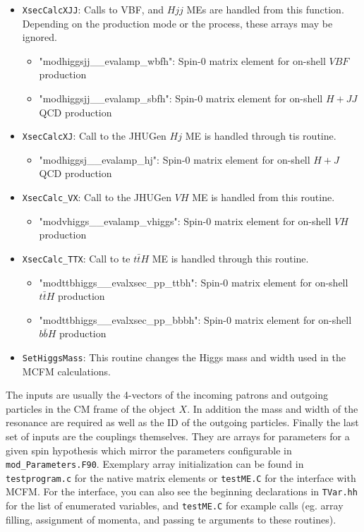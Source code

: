 \documentclass[aps,superscriptaddress,nofootinbib]{revtex4}
\begin{document}
\begin{itemize}
\item \verb|XsecCalcXJJ|: Calls to VBF, and $Hjj$ MEs are handled from this function. Depending on the production mode or the process, these arrays may be ignored.
\begin{itemize}
\item "modhiggsjj\_\_evalamp\_wbfh": Spin-0 matrix element for on-shell $VBF$ production
\item "modhiggsjj\_\_evalamp\_sbfh": Spin-0 matrix element for on-shell $H+JJ$ QCD production
\end{itemize}

\item \verb|XsecCalcXJ|: Call to the JHUGen $Hj$ ME is handled through tis routine.
\begin{itemize}
\item "modhiggsj\_\_evalamp\_hj": Spin-0 matrix element for on-shell $H+J$ QCD production
\end{itemize}

\item \verb|XsecCalc_VX|: Call to the JHUGen $VH$ ME is handled from this routine.
\begin{itemize}
\item "modvhiggs\_\_evalamp\_vhiggs": Spin-0 matrix element for on-shell $VH$ production
\end{itemize}

\item \verb|XsecCalc_TTX|: Call to te $t\bar{t}H$ ME is handled through this routine.
\begin{itemize}
\item "modttbhiggs\_\_evalxsec\_pp\_ttbh": Spin-0 matrix element for on-shell $t\bar{t}H$ production
\item "modttbhiggs\_\_evalxsec\_pp\_bbbh": Spin-0 matrix element for on-shell $b\bar{b}H$ production
\end{itemize}

\item \verb|SetHiggsMass|: This routine changes the Higgs mass and width used in the MCFM calculations.

\end{itemize}

The inputs are usually the 4-vectors of the incoming patrons and outgoing particles in the CM frame of the object $X$.
In addition the mass and width of the resonance are required as well as the ID of the outgoing particles.
Finally the last set of inputs are the couplings themselves.  They are arrays for parameters for a given spin hypothesis
which mirror the parameters configurable in \verb|mod_Parameters.F90|.
Exemplary array initialization can be found in \verb|testprogram.c| for the native matrix elements or \verb|testME.C| for the interface with MCFM.
For the interface, you can also see the beginning declarations in \verb|TVar.hh| for the list of enumerated variables, and \verb|testME.C| for example calls (eg. array filling, assignment of momenta, and passing te arguments to these routines).
\end{document}
